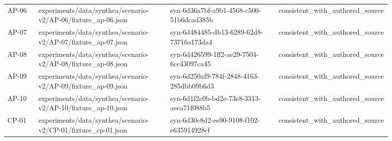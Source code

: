{\begin{longtable}{p{0.08\linewidth}p{0.34\linewidth}p{0.28\linewidth}p{0.2\linewidth}}
AP-\allowbreak{}06 & experiments/\allowbreak{}data/\allowbreak{}synthea/\allowbreak{}scenario-\allowbreak{}v2/\allowbreak{}AP-\allowbreak{}06/\allowbreak{}fixture\_\allowbreak{}ap-\allowbreak{}06.\allowbreak{}json & syn-\allowbreak{}6d36a7bf-\allowbreak{}a9b1-\allowbreak{}4568-\allowbreak{}c500-\allowbreak{}51b6dcad385b & consistent\_\allowbreak{}with\_\allowbreak{}authored\_\allowbreak{}source \\
AP-\allowbreak{}07 & experiments/\allowbreak{}data/\allowbreak{}synthea/\allowbreak{}scenario-\allowbreak{}v2/\allowbreak{}AP-\allowbreak{}07/\allowbreak{}fixture\_\allowbreak{}ap-\allowbreak{}07.\allowbreak{}json & syn-\allowbreak{}6d484485-\allowbreak{}db13-\allowbreak{}6289-\allowbreak{}62d8-\allowbreak{}73716a173da4 & consistent\_\allowbreak{}with\_\allowbreak{}authored\_\allowbreak{}source \\
AP-\allowbreak{}08 & experiments/\allowbreak{}data/\allowbreak{}synthea/\allowbreak{}scenario-\allowbreak{}v2/\allowbreak{}AP-\allowbreak{}08/\allowbreak{}fixture\_\allowbreak{}ap-\allowbreak{}08.\allowbreak{}json & syn-\allowbreak{}6d426599-\allowbreak{}1ff2-\allowbreak{}ae29-\allowbreak{}7504-\allowbreak{}6cc43097ca45 & consistent\_\allowbreak{}with\_\allowbreak{}authored\_\allowbreak{}source \\
AP-\allowbreak{}09 & experiments/\allowbreak{}data/\allowbreak{}synthea/\allowbreak{}scenario-\allowbreak{}v2/\allowbreak{}AP-\allowbreak{}09/\allowbreak{}fixture\_\allowbreak{}ap-\allowbreak{}09.\allowbreak{}json & syn-\allowbreak{}6d250af9-\allowbreak{}784f-\allowbreak{}2848-\allowbreak{}4163-\allowbreak{}285dbb09b6d3 & consistent\_\allowbreak{}with\_\allowbreak{}authored\_\allowbreak{}source \\
AP-\allowbreak{}10 & experiments/\allowbreak{}data/\allowbreak{}synthea/\allowbreak{}scenario-\allowbreak{}v2/\allowbreak{}AP-\allowbreak{}10/\allowbreak{}fixture\_\allowbreak{}ap-\allowbreak{}10.\allowbreak{}json & syn-\allowbreak{}6d1f2c0b-\allowbreak{}bd2e-\allowbreak{}73e8-\allowbreak{}3313-\allowbreak{}aeca71f088b5 & consistent\_\allowbreak{}with\_\allowbreak{}authored\_\allowbreak{}source \\
CP-\allowbreak{}01 & experiments/\allowbreak{}data/\allowbreak{}synthea/\allowbreak{}scenario-\allowbreak{}v2/\allowbreak{}CP-\allowbreak{}01/\allowbreak{}fixture\_\allowbreak{}cp-\allowbreak{}01.\allowbreak{}json & syn-\allowbreak{}6d30c8d2-\allowbreak{}ee90-\allowbreak{}9108-\allowbreak{}f102-\allowbreak{}e635914928cf & consistent\_\allowbreak{}with\_\allowbreak{}authored\_\allowbreak{}source \\

\end{longtable}}
